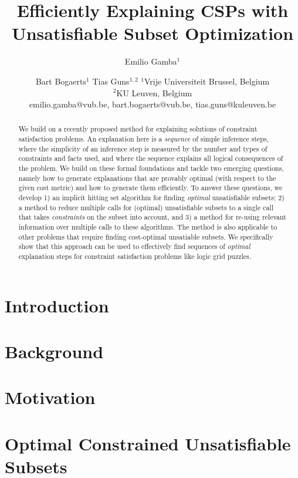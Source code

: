 \documentclass{article}
\title{Efficiently Explaining CSPs with Unsatisfiable Subset Optimization}
\author{
	Emilio Gamba$^1$ \and Bart Bogaerts$^1$ \And Tias Guns$^{1,2}$
	\affiliations
	$^1$Vrije Universiteit Brussel, Belgium\\
	$^2$KU Leuven, Belgium\\
	\emails
	emilio.gamba@vub.be, bart.bogaerts@vub.be,
	tias.guns@kuleuven.be
}
\begin{document}
 
\maketitle

\begin{abstract}
We build on a recently proposed method for explaining solutions of constraint satisfaction problems.
An explanation here is a \textit{sequence} of simple inference steps, where the simplicity of an inference step is measured by the number and types of constraints and facts used, and where the sequence explains all logical consequences of the problem. 
We build on these formal foundations and tackle two emerging questions, namely how to generate explanations that are provably optimal (with respect to the given cost metric) and how to generate them efficiently. 
To answer these questions, we develop 1) an implicit hitting set algorithm for finding \textit{optimal} unsatisfiable subsets; 2) a method to reduce multiple calls for (optimal) unsatisfiable subsets to a single call that takes \emph{constraints} on the subset into account, and 3) a method for re-using relevant information over multiple calls to these algorithms. 
The method is also applicable to other problems that require finding cost-optimal unsatiable subsets.
We specifically show that this approach can be used to effectively find sequences of \textit{optimal} explanation steps for constraint satisfaction problems like logic grid puzzles.
\end{abstract}

\section{Introduction}


\section{Background}\label{sec:backgr}\label{sec:background}


\section{Motivation}\label{sec:motivation}\label{sec:motviation}


\section{Optimal Constrained Unsatisfiable Subsets} \label{sec:ocus}

\end{document}

